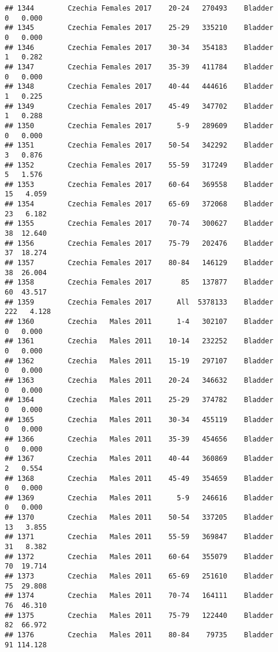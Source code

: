 \documentclass[
]{article}
\begin{document}
\begin{verbatim}
## 1344        Czechia Females 2017    20-24   270493    Bladder      0   0.000
## 1345        Czechia Females 2017    25-29   335210    Bladder      0   0.000
## 1346        Czechia Females 2017    30-34   354183    Bladder      1   0.282
## 1347        Czechia Females 2017    35-39   411784    Bladder      0   0.000
## 1348        Czechia Females 2017    40-44   444616    Bladder      1   0.225
## 1349        Czechia Females 2017    45-49   347702    Bladder      1   0.288
## 1350        Czechia Females 2017      5-9   289609    Bladder      0   0.000
## 1351        Czechia Females 2017    50-54   342292    Bladder      3   0.876
## 1352        Czechia Females 2017    55-59   317249    Bladder      5   1.576
## 1353        Czechia Females 2017    60-64   369558    Bladder     15   4.059
## 1354        Czechia Females 2017    65-69   372068    Bladder     23   6.182
## 1355        Czechia Females 2017    70-74   300627    Bladder     38  12.640
## 1356        Czechia Females 2017    75-79   202476    Bladder     37  18.274
## 1357        Czechia Females 2017    80-84   146129    Bladder     38  26.004
## 1358        Czechia Females 2017       85   137877    Bladder     60  43.517
## 1359        Czechia Females 2017      All  5378133    Bladder    222   4.128
## 1360        Czechia   Males 2011      1-4   302107    Bladder      0   0.000
## 1361        Czechia   Males 2011    10-14   232252    Bladder      0   0.000
## 1362        Czechia   Males 2011    15-19   297107    Bladder      0   0.000
## 1363        Czechia   Males 2011    20-24   346632    Bladder      0   0.000
## 1364        Czechia   Males 2011    25-29   374782    Bladder      0   0.000
## 1365        Czechia   Males 2011    30-34   455119    Bladder      0   0.000
## 1366        Czechia   Males 2011    35-39   454656    Bladder      0   0.000
## 1367        Czechia   Males 2011    40-44   360869    Bladder      2   0.554
## 1368        Czechia   Males 2011    45-49   354659    Bladder      0   0.000
## 1369        Czechia   Males 2011      5-9   246616    Bladder      0   0.000
## 1370        Czechia   Males 2011    50-54   337205    Bladder     13   3.855
## 1371        Czechia   Males 2011    55-59   369847    Bladder     31   8.382
## 1372        Czechia   Males 2011    60-64   355079    Bladder     70  19.714
## 1373        Czechia   Males 2011    65-69   251610    Bladder     75  29.808
## 1374        Czechia   Males 2011    70-74   164111    Bladder     76  46.310
## 1375        Czechia   Males 2011    75-79   122440    Bladder     82  66.972
## 1376        Czechia   Males 2011    80-84    79735    Bladder     91 114.128

\end{verbatim}
\end{document}

